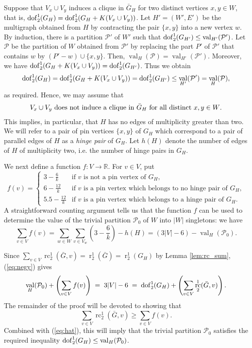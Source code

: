\documentclass[11pt,a4paper]{article}
\theoremstyle{definition}
\DeclareMathOperator{\rr}{r}
\DeclareMathOperator{\rc}{rc}
\DeclareMathOperator{\val}{val}
\newcommand{\dof}{{\rm dof}}
\newcommand{\R}{\mathbb{R}}
\newcommand{\cP}{\mathcal{P}}
\begin{document}
Suppose that $V_x\cup V_y$ induces a clique in $\bar G_H$ for two distinct vertices $x,y\in W$, that is, $\dof_2^1(G_H)=\dof_2^1(G_H+K(V_x\cup V_y))$.
Let $H'=(W',E')$ be the multigraph obtained from $H$ by contracting the pair
$\{x,y\}$ into a new vertex $w$.
By induction, there is a 
partition $\mathcal{P'}$ of  $W'$ such that 
$\dof_2^1(G_{H'})\leq \val_{H'}(\mathcal{P'})$. 
Let $\mathcal{P}$ be the %
partition of $W$ obtained from $\mathcal{P'}$ by replacing the part $P'$  of $\mathcal{P}'$ that contains $w$ by $(P'-w)\cup \{x,y\}$. Then, $\val_{H}(\mathcal{P})= \val_{H'}(\mathcal{P}').$ Moreover, we have $\dof_2^1(G_H+K(V_x\cup V_y))=\dof_2^1(G_{H'})$. Thus we obtain 
$$\dof_2^1(G_H)=\dof_2^1(G_H+K(V_x\cup V_y))= \dof_2^1(G_{H'})\leq \val_{H'}(\mathcal{P}')= \val_{H}(\mathcal{P})
,$$ as required.
Hence, we may assume that
\begin{equation}\label{eq:bodyp:cluster}
\mbox{ $V_x\cup V_y $ does not induce a clique in $ \bar G_H$  for all distinct  $x,y\in W$. } 
\end{equation} 
This implies, in particular, that $H$ has no edges of multiplicity greater than two. We will refer to a pair of pin vertices $\{x,y\}$ of $G_H$ which correspond to a pair of parallel edges of  $H$ as a {\em hinge pair} of $G_H$. Let $h(H)$ denote the number of edges of $H$ of multiplicity two, i.e. the number of hinge pairs in $G_H$.

We next define a function $f:V\to \R$.
For $v\in V$, put
$$
f(v)=
\begin{cases}
3-\frac{6}{k}&  \mbox{if $v$ is not a pin vertex of $G_H$,} \\ 
6-\frac{12}{k}& \mbox{if  $v$ is a pin vertex  which belongs to no hinge pair of $G_H$},\\
5.5-\frac{12}{k}& \mbox{if  $v$ is a pin vertex  which belongs to a hinge pair of $G_H$}. 
\end{cases}
$$
A straightforward counting argument tells us that the function $f$ can be used to determine the value of the trivial partition $\cP_0$ of $W$ into $|W|$ singletons: we have
\begin{equation}\label{eq:negy}
\sum_{v\in V}f(v) =\sum_{w\in W}\sum_{v\in V_w}\left(3-\frac{6}{k}\right)-h(H)=(3|V|-6)-\val_H(\cP_0).
\end{equation}   

Since 
$\sum_{v\in V} \rc_2^1(\bar G,v)=\rr_2^1(\bar G)=\rr_2^1(G_H)$ by Lemma \ref{lem:rc_sum},  (\ref{eq:negy}) gives
\begin{equation}\label{eq:hat}
\val_H(\cP_0)+\left(\sum_{v\in V}f(v)\right)\;=\; 3|V|-6\;=\;\dof_2^1(G_H)+\left(\sum_{v\in V}\rc_2^1(\bar G, v)\right).  
\end{equation}
The remainder of the proof will be devoted to showing that 
\begin{equation}\label{eq:het}
\sum_{v\in V}\rc_2^1(\bar G, v)\geq  \sum_{v\in V} f(v).
\end{equation}
Combined with (\ref{eq:hat}), this will imply that the trivial partition $\cP_0$ satisfies the required inequality $\dof_2^1(G_H)\leq \val_H(\cP_0)$.
\end{document}
